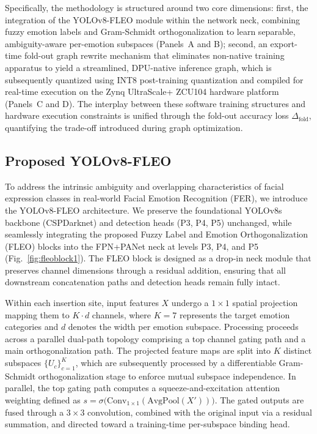 \documentclass[algorithms,article,submit,moreauthors]{Definitions/mdpi}
\begin{document}
Specifically, the methodology is structured around two core dimensions: first, the integration of the YOLOv8-FLEO module within the network neck, combining fuzzy emotion labels and Gram-Schmidt orthogonalization to learn separable, ambiguity-aware per-emotion subspaces (Panels~A and B); second, an export-time fold-out graph rewrite mechanism that eliminates non-native training apparatus to yield a streamlined, DPU-native inference graph, which is subsequently quantized using INT8 post-training quantization and compiled for real-time execution on the Zynq UltraScale+ ZCU104 hardware platform (Panels~C and D). The interplay between these software training structures and hardware execution constraints is unified through the fold-out accuracy loss $\Delta_{\mathrm{fold}}$, quantifying the trade-off introduced during graph optimization.

\subsection{Proposed YOLOv8-FLEO }\label{sec:soft}

To address the intrinsic ambiguity and overlapping characteristics of facial expression classes in real-world Facial Emotion Recognition (FER), we introduce the YOLOv8-FLEO architecture. We preserve the foundational YOLOv8s backbone (CSPDarknet) and detection heads (P3, P4, P5) unchanged, while seamlessly integrating the proposed Fuzzy Label and Emotion Orthogonalization (FLEO) blocks into the FPN+PANet neck at levels P3, P4, and P5 (Fig.~\ref{fig:fleoblock1}). The FLEO block is designed as a drop-in neck module that preserves channel dimensions through a residual addition, ensuring that all downstream concatenation paths and detection heads remain fully intact. 

Within each insertion site, input features $X$ undergo a $1{\times}1$ spatial projection mapping them to $K\!\cdot\!d$ channels, where $K{=}7$ represents the target emotion categories and $d$ denotes the width per emotion subspace. Processing proceeds across a parallel dual-path topology comprising a top channel gating path and a main orthogonalization path. The projected feature maps are split into $K$ distinct subspaces $\{U_c\}_{c=1}^{K}$, which are subsequently processed by a differentiable Gram-Schmidt orthogonalization stage to enforce mutual subspace independence. In parallel, the top gating path computes a squeeze-and-excitation attention weighting defined as $s = \sigma\bigl(\mathrm{Conv}_{1\times1}(\mathrm{AvgPool}(X'))\bigr)$. The gated outputs are fused through a $3{\times}3$ convolution, combined with the original input via a residual summation, and directed toward a training-time per-subspace binding head.
\end{document}
